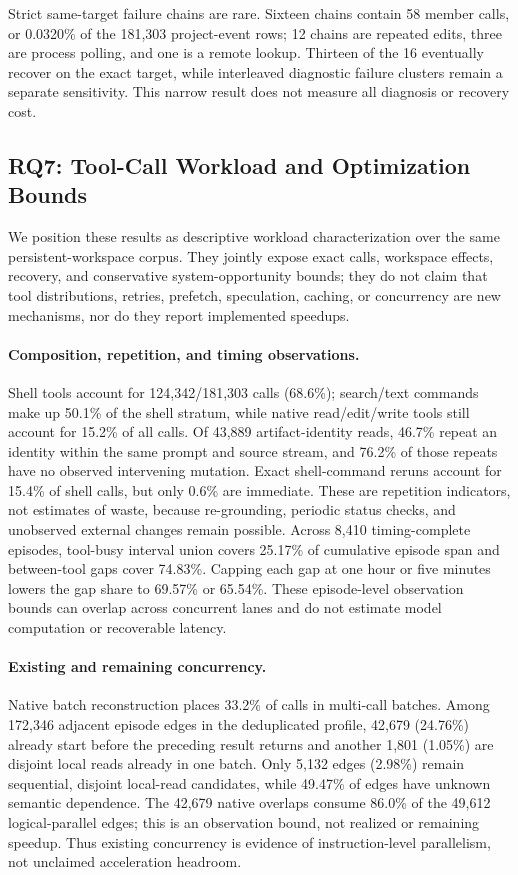 \documentclass[letterpaper]{article}
\begin{document}
Strict same-target failure chains are rare.  Sixteen chains contain 58 member
calls, or 0.0320\% of the 181,303 project-event rows; 12 chains are repeated
edits, three are process polling, and one is a remote lookup.  Thirteen of the
16 eventually recover on the exact target, while interleaved diagnostic
failure clusters remain a separate sensitivity.  This narrow result does not
measure all diagnosis or recovery cost.

\subsection{RQ7: Tool-Call Workload and Optimization Bounds}
\label{sec:rq7-workload}

We position these results as descriptive workload characterization over the
same persistent-workspace corpus.  They jointly expose exact calls, workspace
effects, recovery, and conservative system-opportunity bounds; they do not
claim that tool distributions, retries, prefetch, speculation, caching, or
concurrency are new mechanisms, nor do they report implemented speedups.

\paragraph{Composition, repetition, and timing observations.}
Shell tools account for 124,342/181,303 calls (68.6\%); search/text commands
make up 50.1\% of the shell stratum, while native read/edit/write tools still
account for 15.2\% of all calls.  Of 43,889 artifact-identity reads, 46.7\%
repeat an identity within the same prompt and source stream, and 76.2\% of
those repeats have no observed intervening mutation.  Exact shell-command
reruns account for 15.4\% of shell calls, but only 0.6\% are immediate.  These
are repetition indicators, not estimates of waste, because re-grounding,
periodic status checks, and unobserved external changes remain possible.
Across 8,410 timing-complete episodes, tool-busy interval union covers 25.17\%
of cumulative episode span and between-tool gaps cover 74.83\%.  Capping each
gap at one hour or five minutes lowers the gap share to 69.57\% or 65.54\%.
These episode-level observation bounds can overlap across concurrent lanes and
do not estimate model computation or recoverable latency.

\paragraph{Existing and remaining concurrency.}
Native batch reconstruction places 33.2\% of calls in multi-call batches.
Among 172,346 adjacent episode edges in the deduplicated profile, 42,679
(24.76\%) already start before the preceding result returns and another 1,801
(1.05\%) are disjoint local reads already in one batch.  Only 5,132 edges
(2.98\%) remain sequential, disjoint local-read candidates, while 49.47\% of
edges have unknown semantic dependence.  The 42,679 native overlaps consume
86.0\% of the 49,612 logical-parallel edges; this is an observation bound, not
realized or remaining speedup.  Thus existing concurrency is evidence of
instruction-level parallelism, not unclaimed acceleration headroom.
\end{document}
